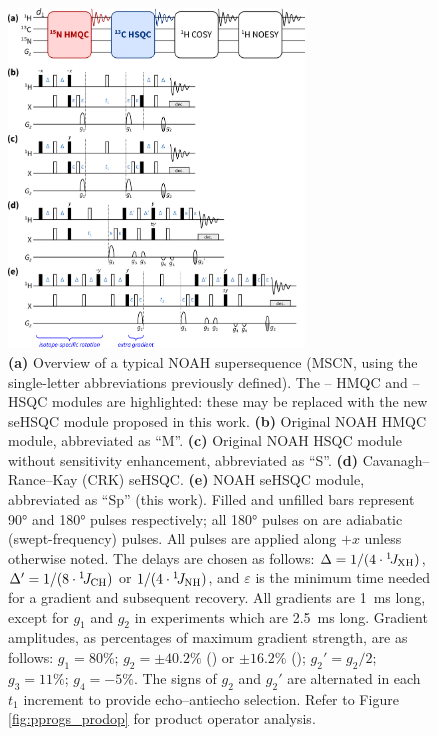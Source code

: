 \documentclass[draft,11pt]{article}
\newcommand*{\carbon}{\ce{^{13}C}}
\newcommand*{\proton}{\ce{^{1}H}}
\newcommand*{\nitrogen}{\ce{^{15}N}}
\newcommand*{\onejxh}{{}^{1}\!J_{\ce{XH}}}
\newcommand*{\onejch}{{}^{1}\!J_{\ce{CH}}}
\newcommand*{\onejnh}{{}^{1}\!J_{\ce{NH}}}
\newcommand*{\figref}[1]{Figure \ref{fig:#1}}
\begin{document}
\begin{figure}
    \centering
    \includegraphics[width=0.7\textwidth]{pprogs.png}
    \caption{
        \textbf{(a)} Overview of a typical NOAH supersequence (MSCN, using the single-letter abbreviations previously defined\autocite{Kupce2017ACIE}).
        The \nitrogen{}--\proton{} HMQC and \carbon{}--\proton{} HSQC modules are highlighted: these may be replaced with the new seHSQC module proposed in this work.
        \textbf{(b)} Original NOAH HMQC module,\autocite{Kupce2017ACIE, Kupce2007MRC} abbreviated as ``M''.
        \textbf{(c)} Original NOAH HSQC module without sensitivity enhancement,\autocite{Kupce2017ACIE, Schulze-Sunninghausen2017JMR} abbreviated as ``S''.
        \textbf{(d)} Cavanagh--Rance--Kay (CRK) seHSQC.\autocite{sehsqc}
        \textbf{(e)} NOAH seHSQC module, abbreviated as ``Sp'' (this work).
        Filled and unfilled bars represent \ang{90} and \ang{180} pulses respectively; all \ang{180} pulses on \carbon{} are adiabatic (swept-frequency) pulses.
        All pulses are applied along $+x$ unless otherwise noted.
        The delays are chosen as follows: $\Delta = 1/(4\cdot\onejxh)$, $\Delta' = 1/(8\cdot\onejch)$ or $1/(4\cdot\onejnh)$, and $\varepsilon$ is the minimum time needed for a gradient and subsequent recovery.
        All gradients are \SI{1}{\ms} long, except for $g_1$ and $g_2$ in \nitrogen{} experiments which are \SI{2.5}{\ms} long.
        Gradient amplitudes, as percentages of maximum gradient strength, are as follows: $g_1 = 80\%$; $g_2 = \pm 40.2\%$ (\carbon{}) or $\pm 16.2\%$ (\nitrogen{}); ${g_2}' = g_2/2$; $g_3 = 11\%$; $g_4 = -5\%$.
        The signs of $g_2$ and ${g_2}'$ are alternated in each $t_1$ increment to provide echo--antiecho selection.
        Refer to \figref{pprogs_prodop} for product operator analysis.
    }
    \label{fig:pprogs}
\end{figure}
\end{document}

